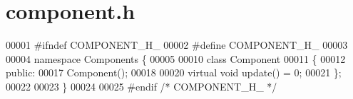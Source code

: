 \section{component.\+h}
\label{component_8h_source}

\begin{DoxyCode}
00001 \textcolor{preprocessor}{#ifndef COMPONENT\_H\_}
00002 \textcolor{preprocessor}{#define COMPONENT\_H\_}
00003 
00004 \textcolor{keyword}{namespace }Components \{
00005     
00010     \textcolor{keyword}{class }Component
00011     \{
00012     \textcolor{keyword}{public}:
00017         Component();
00018 
00020         \textcolor{keyword}{virtual} \textcolor{keywordtype}{void} update() = 0;
00021     \};
00022 
00023 \}
00024 
00025 \textcolor{preprocessor}{#endif }\textcolor{comment}{/* COMPONENT\_H\_ */}\textcolor{preprocessor}{}
\end{DoxyCode}
